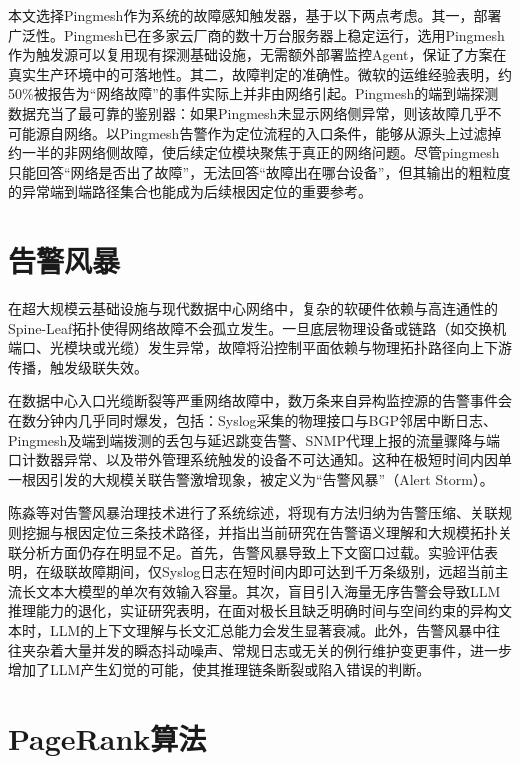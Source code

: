 本文选择Pingmesh作为系统的故障感知触发器，基于以下两点考虑。其一，部署广泛性。Pingmesh已在多家云厂商的数十万台服务器上稳定运行，选用Pingmesh作为触发源可以复用现有探测基础设施，无需额外部署监控Agent，保证了方案在真实生产环境中的可落地性。其二，故障判定的准确性。微软的运维经验表明，约50\%被报告为“网络故障”的事件实际上并非由网络引起。Pingmesh的端到端探测数据充当了最可靠的鉴别器：如果Pingmesh未显示网络侧异常，则该故障几乎不可能源自网络。以Pingmesh告警作为定位流程的入口条件，能够从源头上过滤掉约一半的非网络侧故障，使后续定位模块聚焦于真正的网络问题。尽管pingmesh只能回答“网络是否出了故障”，无法回答“故障出在哪台设备”，但其输出的粗粒度的异常端到端路径集合也能成为后续根因定位的重要参考。


\section{告警风暴}

在超大规模云基础设施与现代数据中心网络中，复杂的软硬件依赖与高连通性的Spine-Leaf拓扑使得网络故障不会孤立发生。一旦底层物理设备或链路（如交换机端口、光模块或光缆）发生异常，故障将沿控制平面依赖与物理拓扑路径向上下游传播，触发级联失效。

在数据中心入口光缆断裂等严重网络故障中，数万条来自异构监控源的告警事件会在数分钟内几乎同时爆发，包括：Syslog采集的物理接口与BGP邻居中断日志、Pingmesh及端到端拨测的丢包与延迟跳变告警、SNMP代理上报的流量骤降与端口计数器异常、以及带外管理系统触发的设备不可达通知。这种在极短时间内因单一根因引发的大规模关联告警激增现象，被定义为“告警风暴”（Alert Storm）。

陈淼等对告警风暴治理技术进行了系统综述，将现有方法归纳为告警压缩、关联规则挖掘与根因定位三条技术路径，并指出当前研究在告警语义理解和大规模拓扑关联分析方面仍存在明显不足。首先，告警风暴导致上下文窗口过载。实验评估表明，在级联故障期间，仅Syslog日志在短时间内即可达到千万条级别，远超当前主流长文本大模型的单次有效输入容量。其次，盲目引入海量无序告警会导致LLM推理能力的退化，实证研究表明，在面对极长且缺乏明确时间与空间约束的异构文本时，LLM的上下文理解与长文汇总能力会发生显著衰减。此外，告警风暴中往往夹杂着大量并发的瞬态抖动噪声、常规日志或无关的例行维护变更事件，进一步增加了LLM产生幻觉的可能，使其推理链条断裂或陷入错误的判断。


\section{PageRank算法}


